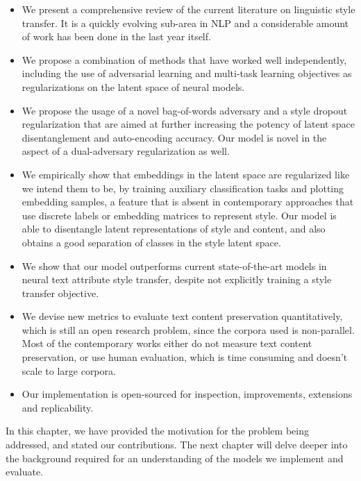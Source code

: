 \begin{itemize}
	\item We present a comprehensive review of the current literature on linguistic style transfer. It is a quickly evolving sub-area in NLP and a considerable amount of work has been done in the last year itself.
	\item We propose a combination of methods that have worked well independently, including the use of adversarial learning and multi-task learning objectives as regularizations on the latent space of neural models.
	\item We propose the usage of a novel bag-of-words adversary and a style dropout regularization that are aimed at further increasing the potency of latent space disentanglement and auto-encoding accuracy. Our model is novel in the aspect of a dual-adversary regularization as well.
	\item We empirically show that embeddings in the latent space are regularized like we intend them to be, by training auxiliary classification tasks and plotting embedding samples, a feature that is absent in contemporary approaches that use discrete labels or embedding matrices to represent style. Our model is able to disentangle latent representations of style and content, and also obtains a good separation of classes in the style latent space.
	\item We show that our model outperforms current state-of-the-art models in neural text attribute style transfer, despite not explicitly training a style transfer objective.
	\item We devise new metrics to evaluate text content preservation quantitatively, which is still an open research problem, since the corpora used is non-parallel. Most of the contemporary works either do not measure text content preservation, or use human evaluation, which is time consuming and doesn't scale to large corpora.
	\item Our implementation is open-sourced for inspection, improvements, extensions and replicability.
\end{itemize}


In this chapter, we have provided the motivation for the problem being addressed, and stated our contributions. The next chapter will delve deeper into the background required for an understanding of the models we implement and evaluate.
